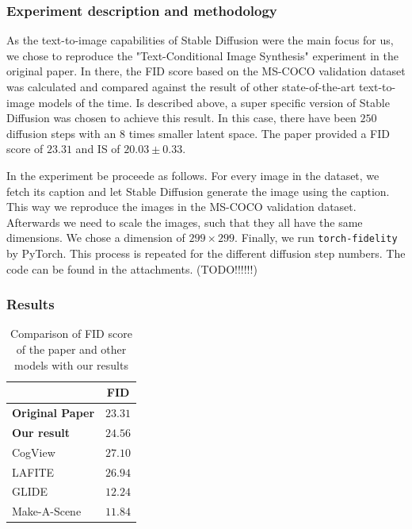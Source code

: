 \documentclass[11pt]{article}
\begin{document}
\subsubsection{Experiment description and methodology}
As the text-to-image capabilities of Stable Diffusion were the main focus for us, we chose to reproduce the "Text-Conditional Image Synthesis" experiment in the original paper. In there, the FID score based on the MS-COCO validation dataset\cite{lin2015microsoftcococommonobjects} was calculated and compared against the result of other state-of-the-art text-to-image models of the time. Is described above, a super specific version of Stable Diffusion was chosen to achieve this result. In this case, there have been $250$ diffusion steps with an $8$ times smaller latent space. The paper provided a FID score of $23.31$ and IS of $20.03 \pm 0.33$.

In the experiment be proceede as follows. For every image in the dataset, we fetch its caption and let Stable Diffusion generate the image using the caption. This way we reproduce the images in the MS-COCO validation dataset. Afterwards we need to scale the images, such that they all have the same dimensions. We chose a dimension of $299\times299$. Finally, we run \texttt{torch-fidelity}\cite{obukhov2020torchfidelity} by PyTorch. This process is repeated for the different diffusion step numbers. The code can be found in the attachments. (TODO!!!!!!)

\subsubsection{Results}
\begin{table}
    \centering
    \begin{tabular}{l|c}
        & \textbf{FID} \\
        \hline
        \textbf{Original Paper} & $23.31$  \\
        \textbf{Our result} & $24.56$  \\
		\hline
		CogView \cite{ding2021cogviewmasteringtexttoimagegeneration} & $27.10$  \\
		LAFITE \cite{zhou2022lafitelanguagefreetrainingtexttoimage} & $26.94$  \\
		GLIDE \cite{rezende2014stochasticbackpropagationapproximateinference} & $12.24$  \\
		Make-A-Scene \cite{gafni2022makeascenescenebasedtexttoimagegeneration} & $11.84$ 
    \end{tabular}
    \caption{Comparison of FID score of the paper and other models with our results}
    \label{tab:fid_is_comparison}
\end{table}
\end{document}
